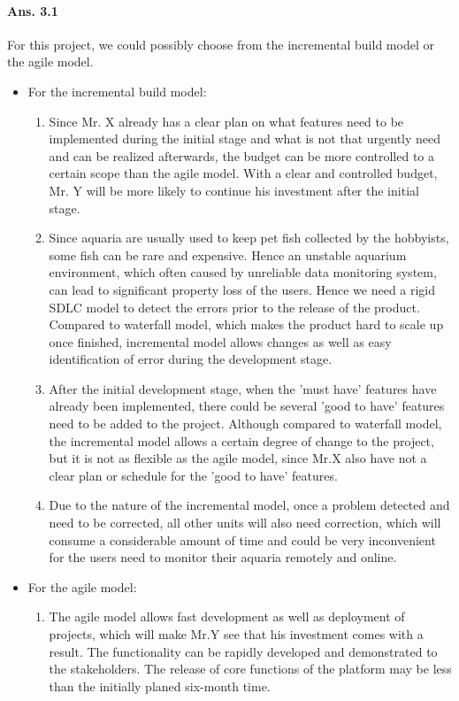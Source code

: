 \documentclass[paper=a4, fontsize=11pt]{scrartcl} %
\numberwithin{equation}{section} %
\numberwithin{figure}{section} %
\numberwithin{table}{section} %
\begin{document}
\paragraph{Ans. 3.1}For this project, we could possibly choose from the incremental build model or the agile model.
\begin{itemize}
	\item For the incremental build model:
	\begin{enumerate}
		\item Since Mr. X already has a clear plan on what features need to be implemented during the initial stage and what is not that urgently need and can be realized afterwards, the budget can be more controlled to a certain scope than the agile model. With a clear and controlled budget, Mr. Y will be more likely to continue his investment after the initial stage.
		\item Since aquaria are usually used to keep pet fish collected by the hobbyists, some fish can be rare and expensive\cite{aquawiki}. Hence an unstable aquarium environment, which often caused by unreliable data monitoring system, can lead to significant property loss  of the users. Hence we need a rigid SDLC model to detect the errors prior to the release of the product. Compared to waterfall model, which makes the product hard to scale up once finished, incremental model allows changes as well as easy identification of error during the development stage.
		\item After the initial development stage, when the 'must have' features have already been implemented, there could be several 'good to have' features need to be added to the project. Although compared to waterfall model, the incremental model allows a certain degree of change to the project, but it is not as flexible as the agile model, since Mr.X also have not a clear plan or schedule for the 'good to have' features. 
		\item Due to the nature of the incremental model, once a problem detected and need to be corrected, all other units will also need correction, which will consume a considerable amount of time\cite{incremodel} and could be very inconvenient for the users need to monitor their aquaria remotely and online.
	\end{enumerate}
	\item For the agile model:
	\begin{enumerate}
		\item The agile model allows fast development as well as deployment of projects, which will make Mr.Y see that his investment comes with a result. The functionality can be rapidly developed and demonstrated to the stakeholders. The release of core functions of the platform may be less than the initially planed six-month time. 

\end{enumerate}
\end{itemize}
\end{document}
